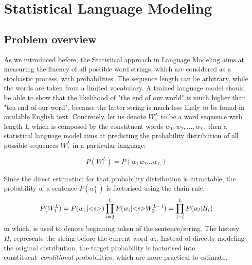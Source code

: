 \section{Statistical Language Modeling}

\subsection{Problem overview}
%

As we introduced before, the Statistical approach in Language Modeling aims at measuring the fluency of all possible word strings, which are considered as a stochastic process, with probabilities. The sequence length can be arbitrary, while the words are taken from a limited vocabulary. A trained language model should be able to show that the likelihood of "the end of our world" is much higher than "tea end of our word", because the latter string is much less likely to be found in available English text. Concretely, let us denote $W_1^L$ to be a word sequence with length $L$ which is composed by the constituent words $w_1,w_2,\dots,w_L$, then a statistical language model aims at predicting the probability distribution of all possible sequences $W_1^L$ in a particular language:

\begin{equation}
P(W_1^L) = P(w_1w_2\dots w_L)
\end{equation}

Since the direct estimation for that probability distribution is intractable, the probability of a sentence $P(w_1^L)$ is factorised using the chain rule:
\begin{equation}
\label{eq:lm1}
P(W_1^L) = P(w_1 | \text{\textless s\textgreater}) \prod_{i=2}^L P(w_i | \text{\textless s\textgreater} W_2^{L-1})\\
= \prod_{i=l}^L P(w_l | H_l)
\end{equation}
in which,  is used to denote beginning token of the sentence/string. The history $H_i$ represents the string before the current word $w_i$. Instead of directly modeling the original distribution, the target probability is factorised into constituent~\textit{conditional} probabilities, which are more practical to estimate. 
%
%

